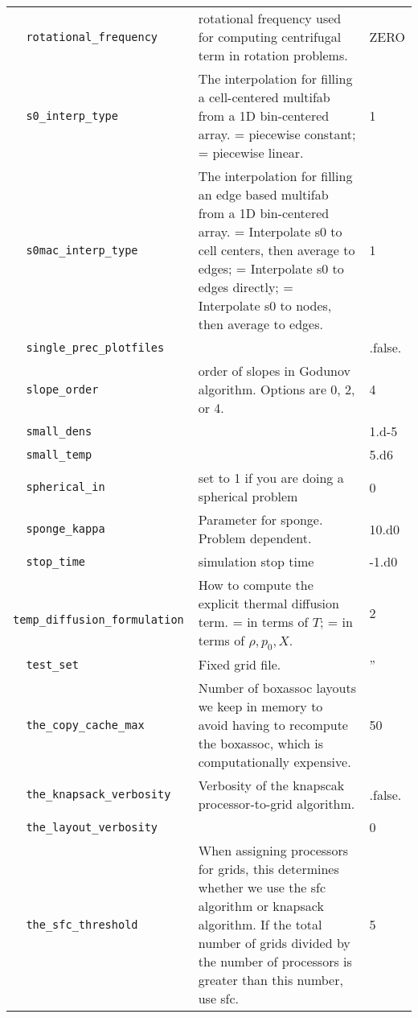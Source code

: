 {\begin{center}
\begin{longtable}{|l|p{3.25in}|l|}
\verb=  rotational_frequency  = &   rotational frequency used for computing centrifugal term in rotation problems.  &  ZERO \\
\verb=  s0_interp_type  = &   The interpolation for filling a cell-centered multifab from a 1D bin-centered array. \newline 1 = piecewise constant; \newline 2 = piecewise linear.  &  1 \\
\verb=  s0mac_interp_type  = &   The interpolation for filling an edge based multifab from a 1D bin-centered array. \newline 1 = Interpolate s0 to cell centers, then average to edges; \newline 2 = Interpolate s0 to edges directly;                \newline 3 = Interpolate s0 to nodes, then average to edges.  &  1 \\
\verb=  single_prec_plotfiles  = &    &  .false. \\
\verb=  slope_order  = &   order of slopes in Godunov algorithm.  Options are 0, 2, or 4.  &  4 \\
\verb=  small_dens  = &    &  1.d-5 \\
\verb=  small_temp  = &    &  5.d6 \\
\verb=  spherical_in  = &   set to 1 if you are doing a spherical problem  &  0 \\
\verb=  sponge_kappa  = &   Parameter for sponge.  Problem dependent.  &  10.d0 \\
\verb=  stop_time  = &   simulation stop time  &  -1.d0 \\
\verb=  temp_diffusion_formulation  = &   How to compute the explicit thermal diffusion term.  \newline 1 = in terms of $T$; \newline 2 = in terms of $\rho,p_0,X$.  &  2 \\
\verb=  test_set  = &   Fixed grid file.  &  '' \\
\verb=  the_copy_cache_max  = &    Number of boxassoc layouts we keep in memory to avoid having to recompute the boxassoc, which is computationally expensive.  &  50 \\
\verb=  the_knapsack_verbosity  = &   Verbosity of the knapscak processor-to-grid algorithm.  &  .false. \\
\verb=  the_layout_verbosity  = &    &  0 \\
\verb=  the_sfc_threshold  = &   When assigning processors for grids, this determines whether we use the sfc algorithm or knapsack algorithm.  If the total number of grids divided by the number of processors is greater than this number, use sfc.  &  5 \\

\end{longtable}
\end{center}}
